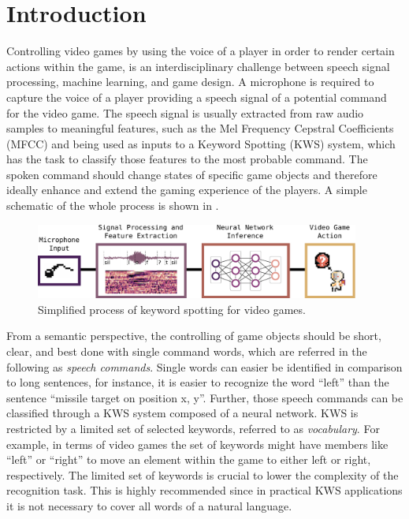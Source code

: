 
\chapter{Introduction}\label{sec:intro}
Controlling video games by using the voice of a player in order to render certain actions within the game, is an interdisciplinary challenge between speech signal processing, machine learning, and game design.
A microphone is required to capture the voice of a player providing a speech signal of a potential command for the video game.
The speech signal is usually extracted from raw audio samples to meaningful features, such as the Mel Frequency Cepstral Coefficients (MFCC) and being used as inputs to a Keyword Spotting (KWS) system, which has the task to classify those features to the most probable command.
The spoken command should change states of specific game objects and therefore ideally enhance and extend the gaming experience of the players.
A simple schematic of the whole process is shown in .
\begin{figure}[!ht]
  \centering
    \includegraphics[width=0.95\textwidth]{./1_intro/figs/intro_kws.pdf}
  \caption{Simplified process of keyword spotting for video games.}
  \label{fig:intro_kws}
\end{figure}
\FloatBarrier
\noindent
From a semantic perspective, the controlling of game objects should be short, clear, and best done with single command words, which are referred in the following as \emph{speech commands}.
Single words can easier be identified in comparison to long sentences, for instance, it is easier to recognize the word \enquote{left} than the sentence \enquote{missile target on position x, y}.
Further, those speech commands can be classified through a KWS system composed of a neural network.
KWS is restricted by a limited set of selected keywords, referred to as \emph{vocabulary}.
For example, in terms of video games the set of keywords might have members like \enquote{left} or \enquote{right} to move an element within the game to either left or right, respectively.
The limited set of keywords is crucial to lower the complexity of the recognition task.
This is highly recommended since in practical KWS applications it is not necessary to cover all words of a natural language.
